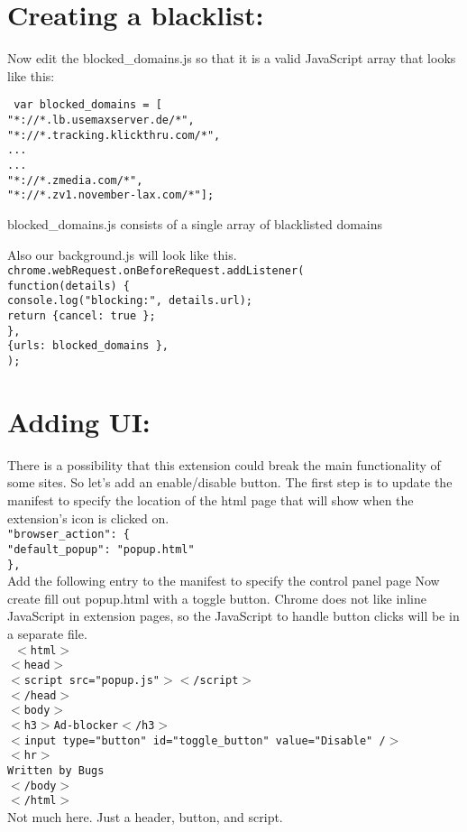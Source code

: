 \documentclass[12pt]{article}
\begin{document}
	\part*{Creating a blacklist:}
	Now edit the blocked\_domains.js so that it is a valid JavaScript array that looks like this:
	
	\texttt{ var blocked\_domains = [ \\
	"*://*.lb.usemaxserver.de/*", \\
	"*://*.tracking.klickthru.com/*", \\
	... \\
	... \\
	"*://*.zmedia.com/*", \\
	"*://*.zv1.november-lax.com/*"]; \\ }

	blocked\_domains.js consists of a single array of blacklisted domains
	
	Also our background.js will look like this.
	\texttt{
	chrome.webRequest.onBeforeRequest.addListener( \\
	function(details) \{ \\
		console.log("blocking:", details.url); \\
		return \{cancel: true \}; \\
	\}, \\
	\{urls: blocked\_domains \}, \\
	["blocking"] 
	);
}  \newpage
	\part*{Adding UI:}
	There is a possibility that this extension could break the main functionality of some sites. So let's add an enable/disable button. The first step is to update the manifest to specify the location of the html page that will show when the extension's icon is clicked on.
	\texttt{ \\
	"browser\_action": \{ \\
		"default\_popup": "popup.html" \\
	\}, \\ }
	Add the following entry to the manifest to specify the control panel page
	Now create fill out popup.html with a toggle button. Chrome does not like inline JavaScript in extension pages, so the JavaScript to handle button clicks will be in a separate file. \\
	\texttt{
	$<$html$>$ \\
	$<$head$>$ \\
	$<$script src="popup.js"$>$$<$/script$>$ \\
	$<$/head$>$ \\
	$<$body$>$ \\
	$<$h3$>$Ad-blocker$<$/h3$>$ \\
	$<$input type="button" id="toggle\_button" value="Disable" /$>$ \\
	$<$hr$>$ \\
	Written by Bugs \\
	$<$/body$>$ \\
	$<$/html$>$ } \\
	Not much here. Just a header, button, and script. \\
	
\end{document}
